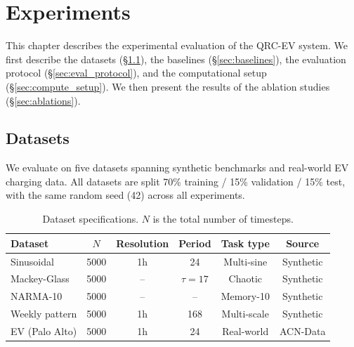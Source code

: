 
\chapter{Experiments}
\label{chap:experiments}

This chapter describes the experimental evaluation of the QRC-EV system.
We first describe the datasets (\S\ref{sec:datasets}), the baselines
(\S\ref{sec:baselines}), the evaluation protocol (\S\ref{sec:eval_protocol}),
and the computational setup (\S\ref{sec:compute_setup}). We then present
the results of the ablation studies (\S\ref{sec:ablations}).



\section{Datasets}
\label{sec:datasets}


We evaluate on five datasets spanning synthetic benchmarks and real-world
EV charging data. All datasets are split 70\% training / 15\% validation
/ 15\% test, with the same random seed (42) across all experiments.


\begin{table}[htbp]
  \centering
  \caption{Dataset specifications. $N$ is the total number of timesteps.}
  \label{tab:datasets}
  \begin{tabular}{@{}lccccc@{}}
    \toprule
    Dataset & $N$ & Resolution & Period & Task type &
    Source \\
    \midrule
    Sinusoidal & 5000 & 1h & 24 & Multi-sine & Synthetic \\
    Mackey-Glass & 5000 & -- & $\tau=17$ & Chaotic & Synthetic \\
    NARMA-10 & 5000 & -- & -- & Memory-10 & Synthetic \\
    Weekly pattern & 5000 & 1h & 168 & Multi-scale & Synthetic \\
    EV (Palo Alto) & 5000 & 1h & 24 & Real-world & ACN-Data \\
    \bottomrule
  \end{tabular}
\end{table}

